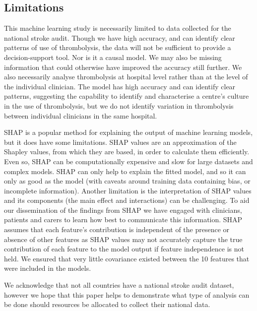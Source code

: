 
\subsection{Limitations}

This machine learning study is necessarily limited to data collected for the national stroke audit. Though we have high accuracy, and can identify clear patterns of use of thrombolysis, the data will not be sufficient to provide a decision-support tool. Nor is it a causal model. We may also be missing information that could otherwise have improved the accuracy still further. We also necessarily analyse thrombolysis at hospital level rather than at the level of the individual clinician. The model has high accuracy and can identify clear patterns, suggesting the capability to identify and characterise a centre's culture in the use of thrombolysis, but we do not identify variation in thrombolysis between individual clinicians in the same hospital.

SHAP is a popular method for explaining the output of machine learning models, but it does have some limitations. SHAP values are an approximation of the Shapley values, from which they are based, in order to calculate them efficiently. Even so, SHAP can be computationally expensive and slow for large datasets and complex models. SHAP can only help to explain the fitted model, and so it can only as good as the model (with caveats around training data containing bias, or incomplete information). Another limitation is the interpretation of SHAP values and its components (the main effect and interactions) can be challenging. To aid our dissemination of the findings from SHAP we have engaged with clinicians, patients and carers to learn how best to communicate this information. SHAP assumes that each feature's contribution is independent of the presence or absence of other features as SHAP values may not accurately capture the true contribution of each feature to the model output if feature independence is not held. We ensured that very little covariance existed between the 10 features that were included in the models. %

We acknowledge that not all countries have a national stroke audit dataset, however we hope that this paper helps to demonstrate what type of analysis can be done should resources be allocated to collect their national data.